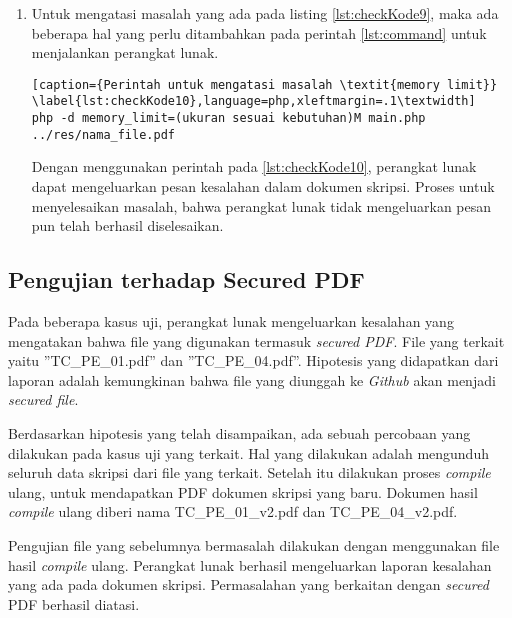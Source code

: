 \begin{enumerate}
	\item Untuk mengatasi masalah yang ada pada listing \ref{lst:checkKode9}, maka ada beberapa hal yang perlu ditambahkan pada perintah \ref{lst:command} untuk menjalankan perangkat lunak.

\begin{lstlisting}[caption={Perintah untuk mengatasi masalah \textit{memory limit}}	\label{lst:checkKode10},language=php,xleftmargin=.1\textwidth]
php -d memory_limit=(ukuran sesuai kebutuhan)M main.php ../res/nama_file.pdf
\end{lstlisting}

	Dengan menggunakan perintah pada \ref{lst:checkKode10}, perangkat lunak dapat mengeluarkan pesan kesalahan dalam dokumen skripsi. Proses untuk menyelesaikan masalah, bahwa perangkat lunak tidak mengeluarkan pesan pun telah berhasil diselesaikan.

\end{enumerate}

\subsection{Pengujian terhadap Secured PDF}
\label{secured}

Pada beberapa kasus uji, perangkat lunak mengeluarkan kesalahan yang mengatakan bahwa file yang digunakan termasuk \textit{secured PDF}. File yang terkait yaitu ''TC\_PE\_01.pdf'' dan ''TC\_PE\_04.pdf''. Hipotesis yang didapatkan dari laporan adalah kemungkinan bahwa file yang diunggah ke \textit{Github} akan menjadi \textit{secured file}.

Berdasarkan hipotesis yang telah disampaikan, ada sebuah percobaan yang dilakukan pada kasus uji yang terkait. Hal yang dilakukan adalah mengunduh seluruh data skripsi dari file yang terkait. Setelah itu dilakukan proses \textit{compile} ulang, untuk mendapatkan PDF dokumen skripsi yang baru. Dokumen hasil \textit{compile} ulang diberi nama TC\_PE\_01\_v2.pdf dan TC\_PE\_04\_v2.pdf. 

Pengujian file yang sebelumnya bermasalah dilakukan dengan menggunakan file hasil \textit{compile} ulang. Perangkat lunak berhasil mengeluarkan laporan kesalahan yang ada pada dokumen skripsi. Permasalahan yang berkaitan dengan \textit{secured} PDF berhasil diatasi.